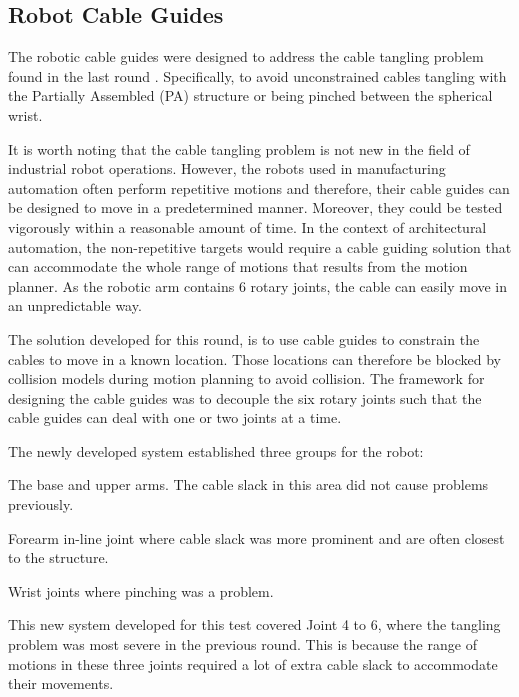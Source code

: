 \subsection{Robot Cable Guides}
\label{subsection:exploration-3-robot-cable-guides}

The robotic cable guides were designed to address the cable tangling problem found in the last round . Specifically, to avoid unconstrained cables tangling with the Partially Assembled (PA) structure or being pinched between the spherical wrist.

It is worth noting that the cable tangling problem is not new in the field of industrial robot operations. However, the robots used in manufacturing automation often perform repetitive motions and therefore, their cable guides can be designed to move in a predetermined manner. Moreover, they could be tested vigorously within a reasonable amount of time. In the context of architectural automation, the non-repetitive targets would require a cable guiding solution that can accommodate the whole range of motions that results from the motion planner. As the robotic arm contains 6 rotary joints, the cable can easily move in an unpredictable way.

The solution developed for this round, is to use cable guides to constrain the cables to move in a known location. Those locations can therefore be blocked by collision models during motion planning to avoid collision. The framework for designing the cable guides was to decouple the six rotary joints such that the cable guides can deal with one or two joints at a time.

The newly developed system established three groups for the robot:

\begin{description}[] %
	\item [Joint 1 to 3] The base and upper arms. The cable slack in this area did not cause problems previously.
	\item [Joint 4] Forearm in-line joint where cable slack was more prominent and are often closest to the structure.
	\item [Joint 5 and 6] Wrist joints where pinching was a problem.
\end{description}

This new system developed for this test covered Joint 4 to 6, where the tangling problem was most severe in the previous round. This is because the range of motions in these three joints required a lot of extra cable slack to accommodate their movements.

